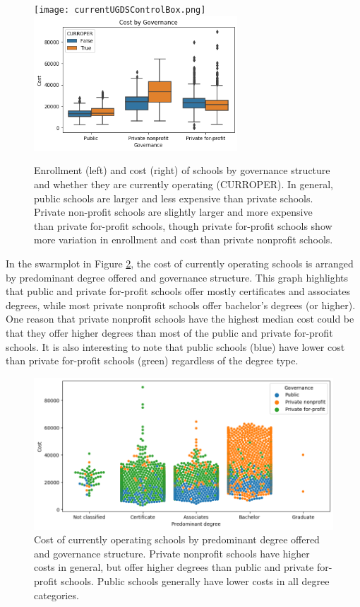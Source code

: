 \documentclass[11pt, letterpaper]{article}
\begin{document}
\begin{figure}[h]
\begin{center}
\texttt{[image: currentUGDSControlBox.png]}
\includegraphics[width=3in]{currentCostGovBox.png}
\caption{Enrollment (left) and cost (right) of schools by governance structure and whether they are currently operating (CURROPER).  In general, public schools are larger and less expensive than private schools. Private non-profit schools are slightly larger and more expensive than private for-profit schools, though private for-profit schools show more variation in enrollment and cost than private nonprofit schools.}
\label{fig:Control}
\end{center}
\end{figure}

In the swarmplot in Figure \ref{fig:CostDegree}, the cost of currently operating schools is arranged by predominant degree offered and governance structure. This graph highlights that public and private for-profit schools offer mostly certificates and associates degrees, while most private nonprofit schools offer bachelor's degrees (or higher). One reason that private nonprofit schools have the highest median cost could be that they offer higher degrees than most of the public and private for-profit schools. It is also interesting to note that public schools (blue) have lower cost than private for-profit schools (green) regardless of the degree type.

\begin{figure}[h]
\begin{center}
\includegraphics[width=6in]{currentPriceDegreeSwarm.png}
\caption{Cost of currently operating schools by predominant degree offered and governance structure. Private nonprofit schools have higher costs in general, but offer higher degrees than public and private for-profit schools. Public schools generally have lower costs in all degree categories.} 
\label{fig:CostDegree}
\end{center}
\end{figure}
\end{document}
